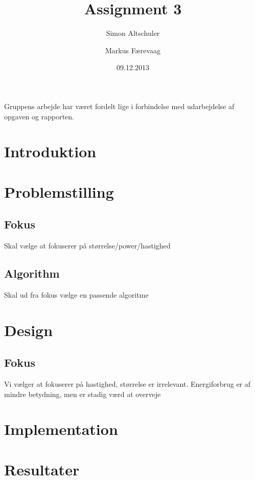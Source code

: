 \documentclass{article}
\title{Assignment 3}
\date{09.12.2013}
\author{
  Simon Altschuler\\
  \code{s123563}
  \and
  Markus Færevaag\\
  \code{s123692}
}
\begin{document}
\maketitle
\centerline{Gruppens arbejde har været fordelt lige i forbindelse med udarbejdelse
af opgaven og rapporten.}
\clearpage

\tableofcontents
\clearpage

\section{Introduktion}

\section{Problemstilling}
\subsection{Fokus}
Skal vælge at fokuserer på størrelse/power/hastighed

\subsection{Algorithm}
Skal ud fra fokus vælge en passende algoritme

\section{Design}
\subsection{Fokus}
Vi vælger at fokuserer på hastighed, størrelse er
irrelevant. Energiforbrug er af mindre betydning, men er stadig værd
at overveje


\section{Implementation}

\section{Resultater}
\end{document}
